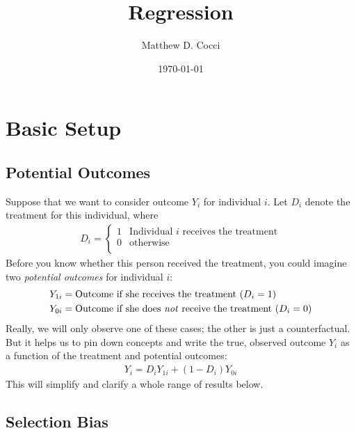 \documentclass[12pt]{article}
\author{Matthew D. Cocci}
\title{Regression}
\date{\today}
\theoremstyle{plain}
\theoremstyle{definition}
\theoremstyle{remark}
\begin{document}
\maketitle

\section{Basic Setup}

\subsection{Potential Outcomes}

Suppose that we want to consider outcome $Y_i$ for individual $i$.
Let $D_i$ denote the treatment for this individual, where
\begin{align*}
  D_i =
  \begin{cases}
    1 & \text{Individual $i$ receives the treatment} \\
    0 & \text{otherwise} \\
  \end{cases}
\end{align*}
Before you know whether this person received the treatment, you could
imagine two \emph{potential outcomes} for individual $i$:
\begin{align*}
  Y_{1i}
  &= \text{Outcome if she receives the treatment ($D_i=1$)} \\
  Y_{0i}
  &= \text{Outcome if she does \emph{not} receive the treatment ($D_i=0$)}
\end{align*}
Really, we will only observe one of these cases; the other is just a
counterfactual. But it helps us to pin down concepts and write the true,
observed outcome $Y_i$ as a function of the treatment and potential
outcomes:
\begin{align}
  Y_i = D_i Y_{1i} + (1 - D_i) Y_{0i}
  \label{potential}
\end{align}
This will simplify and clarify a whole range of results below.

\subsection{Selection Bias}
\end{document}
